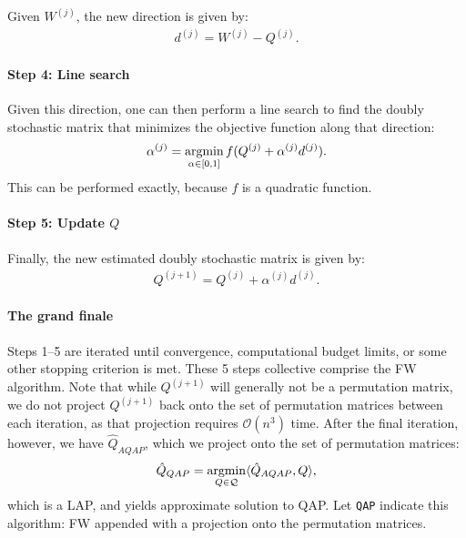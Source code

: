 \documentclass{article} %
\newcommand{\argmin}{\operatornamewithlimits{argmin}}
\providecommand{\mc}[1]{\mathcal{#1}}
\providecommand{\mh}[1]{\hat{#1}}
\newcommand{\qap}{\texttt{QAP} }
\begin{document}
Given $W^{(j)}$, the new direction is given by:
\begin{align}
	d^{(j)}=W^{(j)}-Q^{(j)}.
\end{align}


\paragraph{Step 4: Line search} %
\label{par:step_4_line_search}


Given this direction, one can then perform a line search to find the doubly stochastic matrix that minimizes the objective function along that direction:
\begin{align}
	\alpha^{(j)} = \argmin_{\alpha \in [0,1]} f(Q^{(j)} + \alpha^{(j)} d^{(j)}).
\end{align}
This can be performed exactly, because $f$ is a quadratic function.  


\paragraph{Step 5: Update $Q$} %
\label{par:step_5_update_q_}

Finally, the new estimated doubly stochastic matrix is given by:
\begin{align}\label{eq:update}
	Q^{(j+1)} = Q^{(j)} + \alpha^{(j)} d^{(j)}.
\end{align}


\paragraph{The grand finale} %
\label{par:the_final_iteration}

Steps 1--5 are iterated until convergence, computational budget limits, or some other stopping criterion is met.  These 5 steps collective comprise the FW algorithm.  Note that while $Q^{(j+1)}$ will generally not be a permutation matrix, we do not project $Q^{(j+1)}$ back onto the set of permutation matrices between each iteration, as that projection requires $\mc{O}(n^3)$ time. After the final iteration, however, we have $\mh{Q}_{AQAP}$, which we project onto the set of permutation matrices:
\begin{align} \label{eq:proj}
	\mh{Q}_{QAP} = \argmin_{Q \in \mc{Q}} \langle \mh{Q}_{AQAP}, Q \rangle,
\end{align}
which is a LAP, and yields approximate solution to QAP.  Let \qap indicate this algorithm: FW appended with a projection onto the permutation matrices.
\end{document}
